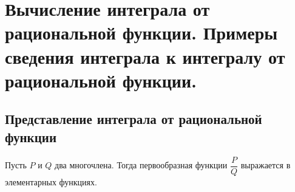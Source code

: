 \documentclass[a4paper]{article}
\theoremstyle{named}
\begin{document}
    \section{Вычисление интеграла от рациональной функции. Примеры сведения интеграла к интегралу от рациональной функции.}

        \subsection{Представление интеграла от рациональной функции}

        \begin{theorem*}
            Пусть $P$ и $Q$ два многочлена. Тогда первообразная функции $\dfrac{P}{Q}$ выражается в элементарных функциях.
        \end{theorem*}
\end{document}
